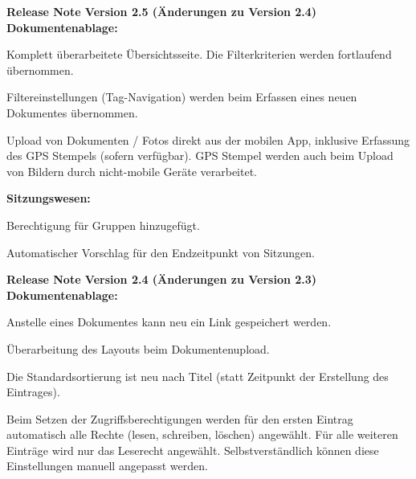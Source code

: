 \vspace{\baselineskip}
\textbf{Release Note Version 2.5 (Änderungen zu Version 2.4)} \\
\textbf{Dokumentenablage:}
\begin{compactitem}
  \item Komplett überarbeitete Übersichtsseite. Die Filterkriterien werden fortlaufend übernommen.
	\item Filtereinstellungen (Tag-Navigation) werden beim Erfassen eines neuen Dokumentes übernommen.
	\item Upload von Dokumenten / Fotos direkt aus der mobilen App, inklusive Erfassung des GPS Stempels (sofern verfügbar). GPS Stempel werden auch beim Upload von Bildern durch nicht-mobile Geräte verarbeitet.
\end{compactitem}
\textbf{Sitzungswesen:}
\begin{compactitem}
  \item Berechtigung für Gruppen hinzugefügt.
	\item Automatischer Vorschlag für den Endzeitpunkt von Sitzungen.
\end{compactitem}

\vspace{\baselineskip}

\textbf{Release Note Version 2.4 (Änderungen zu Version 2.3)} \\
\textbf{Dokumentenablage:}
\begin{compactitem}
  \item Anstelle eines Dokumentes kann neu ein Link gespeichert werden.
	\item Überarbeitung des Layouts beim Dokumentenupload.
	\item Die Standardsortierung ist neu nach Titel (statt Zeitpunkt der Erstellung des Eintrages).
	\item Beim Setzen der Zugriffsberechtigungen werden für den ersten Eintrag automatisch alle Rechte (lesen, schreiben, löschen) angewählt. Für alle weiteren Einträge wird nur das Leserecht angewählt. Selbstverständlich können diese Einstellungen manuell angepasst werden.	
\end{compactitem}

\vspace{\baselineskip}

